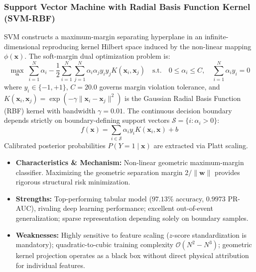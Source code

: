 \documentclass[11pt,a4paper]{article}
\begin{document}
\subsubsection{Support Vector Machine with Radial Basis Function Kernel (SVM-RBF)}
SVM constructs a maximum-margin separating hyperplane in an infinite-dimensional reproducing kernel Hilbert space induced by the non-linear mapping $\phi(\mathbf{x})$. The soft-margin dual optimization problem is:
\begin{equation*}
    \max_{\boldsymbol{\alpha}} \; \sum_{i=1}^N \alpha_i - \frac{1}{2}\sum_{i=1}^N \sum_{j=1}^N \alpha_i \alpha_j y_i y_j K(\mathbf{x}_i, \mathbf{x}_j) \quad \text{s.t.} \quad 0 \le \alpha_i \le C, \quad \sum_{i=1}^N \alpha_i y_i = 0
\end{equation*}
where $y_i \in \{-1, +1\}$, $C = 20.0$ governs margin violation tolerance, and $K(\mathbf{x}_i, \mathbf{x}_j) = \exp(-\gamma \|\mathbf{x}_i - \mathbf{x}_j\|^2)$ is the Gaussian Radial Basis Function (RBF) kernel with bandwidth $\gamma = 0.01$. The continuous decision boundary depends strictly on boundary-defining support vectors $\mathcal{S} = \{i : \alpha_i > 0\}$:
\begin{equation*}
    f(\mathbf{x}) = \sum_{i \in \mathcal{S}} \alpha_i y_i K(\mathbf{x}_i, \mathbf{x}) + b
\end{equation*}
Calibrated posterior probabilities $P(Y=1 \mid \mathbf{x})$ are extracted via Platt scaling.
\begin{itemize}\setlength{\itemsep}{1.5pt}\setlength{\parskip}{0pt}
    \item \textbf{Characteristics \& Mechanism:} Non-linear geometric maximum-margin classifier. Maximizing the geometric separation margin $2/\|\mathbf{w}\|$ provides rigorous structural risk minimization.
    \item \textbf{Strengths:} Top-performing tabular model ($97.13\%$ accuracy, $0.9973$ PR-AUC), rivaling deep learning performance; excellent out-of-event generalization; sparse representation depending solely on boundary samples.
    \item \textbf{Weaknesses:} Highly sensitive to feature scaling ($z$-score standardization is mandatory); quadratic-to-cubic training complexity $\mathcal{O}(N^2 - N^3)$; geometric kernel projection operates as a black box without direct physical attribution for individual features.
\end{itemize}
\end{document}
